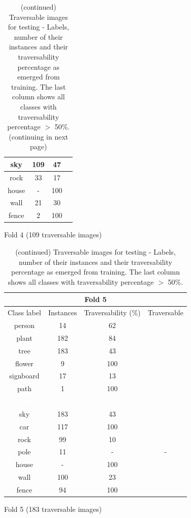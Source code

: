 \documentclass[12pt,a4paper,table,dvipsnames,tikz]{report}
\newcommand{\white}[1]{\textbf{\textcolor{white}{#1}}} %
\begin{document}
\begin{table}[h!]
\begin{subtable}[h!]{\textwidth}
\begin{tabular}{|c|c|c|c|}
				\hline
				\rowcolor{sky}
				sky & 109 & 47 &\\
				\hline
				rock & 33 & 17 &\\
				\hline
				\rowcolor{house}
				house & - & 100 & \checkmark\\
				\hline
				wall & 21 & 30 &\\
				\hline
				fence & 2 & 100 & \checkmark\\
				\hline
			\end{tabular}
			\caption{Fold 4 (109 traversable images)}
			\label{table:trav.f4}
		\end{subtable}
		\caption{(continued) Traversable images for testing - Labels, number of their instances 
			and their traversability percentage as emerged from training. The last column shows 
			all classes with traversability percentage $>$ 50\%. (continuing in next page)}
	\end{table}
	
	\begin{table}[h!]
		\ContinuedFloat %
		\begin{subtable}[h!]{\textwidth}
			\centering
			\begin{tabular}{|c|c|c|c|}
				\hline
				\multicolumn{4}{|c|}{Fold 5}\\
				\hline
				Class label & Instances & Traversability (\%) & Traversable\\
				\hline\hline
				person & 14 & 62 & \checkmark\\
				\hline		
				plant & 182 & 84 & \checkmark\\
				\hline
				\rowcolor{tree}
				tree & 183 & 43 &\\
				\hline
				flower & 9 & 100 & \checkmark\\
				\hline
				signboard & 17 & 13 &\\
				\hline
				path & 1 & 100 & \checkmark\\
				\hline
				\rowcolor{earth}
				\white{earth} & \white{183} & \white{43} &\\
				\hline
				\rowcolor{sky}
				sky & 183 & 43 &\\
				\hline
				car & 117 & 100 & \checkmark\\
				\hline
				rock & 99 & 10 &\\
				\hline
				pole & 11 & - & -\\
				\hline
				\rowcolor{house}
				house & - & 100 & \checkmark\\
				\hline
				wall & 100 & 23 &\\
				\hline
				fence & 94 & 100 & \checkmark\\
				\hline
			\end{tabular}
			\caption{Fold 5 (183 traversable images)}
			\label{table:trav.f5}
		\end{subtable}
		\caption{(continued) Traversable images for testing - Labels, number of their instances 
			and their traversability percentage as emerged from training. The last column shows 
			all classes with traversability percentage $>$ 50\%.}
	\end{table}
	
\end{document}
